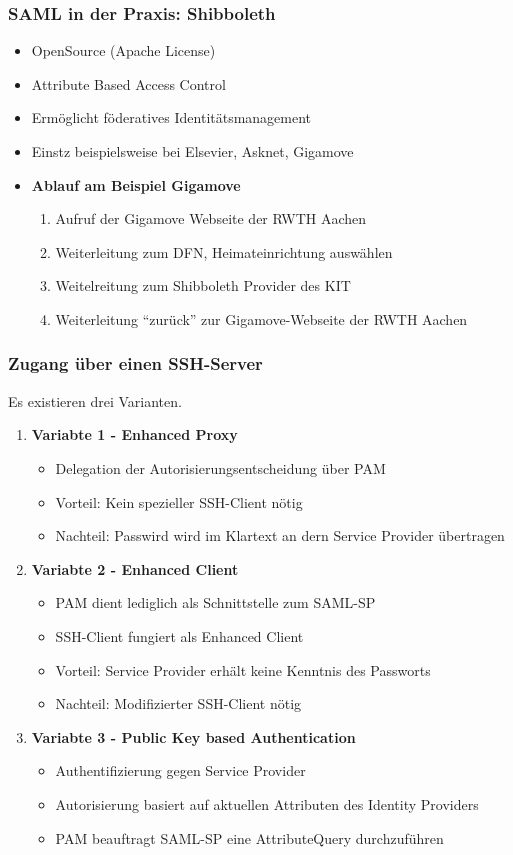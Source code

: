 \subsubsection{SAML in der Praxis: Shibboleth}
\begin{itemize}
	\item OpenSource (Apache License)
	\item Attribute Based Access Control
	\item Ermöglicht föderatives Identitätsmanagement
	\item Einstz beispielsweise bei Elsevier, Asknet, Gigamove
	\item \textbf{Ablauf am Beispiel Gigamove}
	\begin{enumerate}
		\item Aufruf der Gigamove Webseite der RWTH Aachen
		\item Weiterleitung zum DFN, Heimateinrichtung auswählen
		\item Weitelreitung zum Shibboleth Provider des KIT
		\item Weiterleitung "`zurück"' zur Gigamove-Webseite der RWTH Aachen
	\end{enumerate}
\end{itemize}

\subsubsection{Zugang über einen SSH-Server}
Es existieren drei Varianten.
\begin{enumerate}
	\item \textbf{Variabte 1 - Enhanced Proxy}
	\begin{itemize}
		\item Delegation der Autorisierungsentscheidung über PAM
		\item Vorteil: Kein spezieller SSH-Client nötig
		\item Nachteil: Passwird wird im Klartext an dern Service Provider übertragen
	\end{itemize}
	\item \textbf{Variabte 2 - Enhanced Client}
	\begin{itemize}
		\item PAM dient lediglich als Schnittstelle zum SAML-SP
		\item SSH-Client fungiert als Enhanced Client
		\item Vorteil: Service Provider erhält keine Kenntnis des Passworts
		\item Nachteil: Modifizierter SSH-Client nötig
	\end{itemize}
	\item \textbf{Variabte 3 - Public Key based Authentication}
	\begin{itemize}
		\item Authentifizierung gegen Service Provider
		\item Autorisierung basiert auf aktuellen Attributen des Identity Providers
		\item PAM beauftragt SAML-SP eine AttributeQuery durchzuführen
	\end{itemize}
\end{enumerate}

